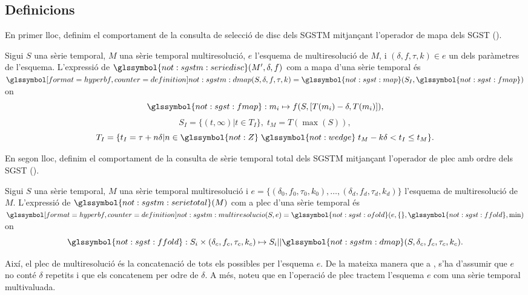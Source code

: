 \subsection{Definicions}

En primer lloc, definim el comportament de la consulta de selecció de disc
dels \gls{SGSTM} mitjançant l'operador de mapa dels \gls{SGST}
().


\begin{definition}
Sigui $S$ una sèrie temporal, $M$ una sèrie temporal multiresolució,
$e$ l'esquema de multiresolució de $M$, i $(\delta,f,\tau,k)\in e$
un dels paràmetres de l'esquema. L'expressió de
$\glssymbol{not:sgstm:seriedisc}(M',\delta,f)$ com a mapa d'una sèrie
temporal és $\glssymboldef{not:sgstm:dmap}(S,\delta,f,\tau,k)=
\glssymbol{not:sgst:map}(S_I,\glssymbol{not:sgst:fmap})$ on
  \[
  \glssymbol{not:sgst:fmap}: m_i\mapsto f(S, [T(m_i)-\delta,T(m_i)]),
  \]
  \[
  S_I = \{ (t,\infty) | t\in T_I  \},\;  t_M = T(\max(S)),
  \]
  \[
  T_I = \{ t_I = \tau+n\delta | n\in\glssymbol{not:Z}\; \glssymbol{not:wedge}\; t_M - k\delta <
  t_I \leq t_M \}.
  \]
\end{definition}




En segon lloc, definim el comportament de la consulta de sèrie
temporal total dels \gls{SGSTM} mitjançant l'operador de plec amb
ordre dels \gls{SGST} ().


\begin{definition}
  Sigui $S$ una sèrie temporal, $M$ una sèrie temporal multiresolució
  i $e = \{ (\delta_0,f_0,\tau_0,k_0), \ldots,
  (\delta_d,f_d,\tau_d,k_d)\}$ l'esquema de multiresolució de $M$.
  L'expressió de $\glssymbol{not:sgstm:serietotal}(M)$ com a plec
  d'una sèrie temporal és
  $\glssymboldef{not:sgstm:multiresolucio}(S,e)=
  \glssymbol{not:sgst:ofold}(e,\{\},\glssymbol{not:sgst:ffold},\min)$
  on 
  \[
  \glssymbol{not:sgst:ffold}: S_i \times (\delta_c,f_c,\tau_c,k_c)
  \mapsto S_i ||
  \glssymbol{not:sgstm:dmap}(S,\delta_c,f_c,\tau_c,k_c).
  \]
  
  Així, el plec de multiresolució és la concatenació de tots els
   possibles per l'esquema $e$. De la
  mateixa manera que a , s'ha d'assumir que
  $e$ no conté $\delta$ repetits i que els concatenem per odre de
  $\delta$. A més, noteu que en l'operació de plec tractem l'esquema
  $e$ com una sèrie temporal multivaluada.

\end{definition}





